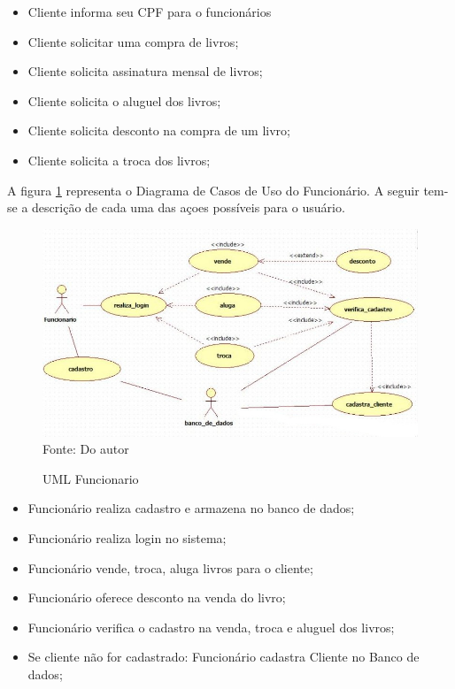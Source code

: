 \begin{itemize}
\item Cliente informa seu CPF para o funcionários
\item Cliente solicitar uma compra de livros;
\item Cliente solicita assinatura mensal de livros;
\item Cliente solicita o aluguel dos livros;
\item Cliente solicita desconto na compra de um livro;
\item Cliente solicita a troca dos livros;
\end{itemize}

A figura \ref{uml_funcionario} representa o Diagrama de Casos de Uso do
Funcionário. A seguir tem-se a descrição de cada uma das açoes possíveis para
o usuário.


\begin{figure}[ht]
	\centering 
	\caption{UML Funcionario}
	\label{uml_funcionario}
	\includegraphics[scale = 0.50]{imagens/uml-funcionario.jpg}
	\\Fonte: Do autor
\end{figure}

\begin{itemize}
\item Funcionário realiza cadastro e armazena no banco de dados;
\item Funcionário realiza login no sistema;
\item Funcionário vende, troca, aluga livros para o cliente;
\item Funcionário oferece desconto na venda do livro;
\item Funcionário verifica o cadastro na venda, troca e aluguel dos livros;
\item Se cliente não for cadastrado: Funcionário cadastra Cliente no Banco de dados;
\end{itemize}

